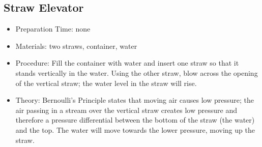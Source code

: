 \subsection{Straw Elevator}
\begin{itemize}
\item{Preparation Time: none}
\item{Materials: two straws, container, water}
\item{Procedure: Fill the container with water and insert one straw so that it stands vertically in the water. Using the other straw, blow across the opening of the vertical straw; the water level in the straw will rise.}
\item{Theory: Bernoulli’s Principle states that moving air causes low pressure; the air passing in a stream over the vertical straw creates low pressure and therefore a pressure differential between the bottom of the straw (the water) and the top. The water will move towards the lower pressure, moving up the straw.}
\end{itemize}

